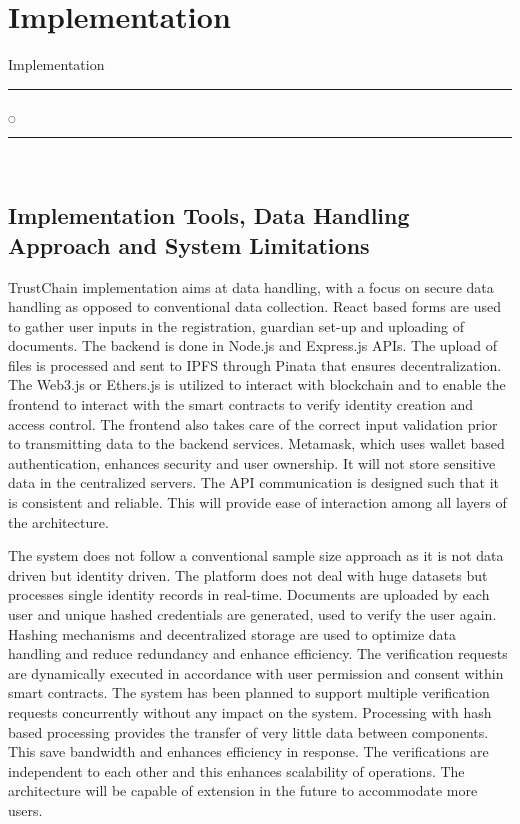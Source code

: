 
\chapter[Implementation]{Implementation}{Implementation}\label{im}

\noindent
\rule{0.49\textwidth}{0.75pt} $_{\bigcirc}$ \rule{0.49\textwidth}{0.75pt}\\


\section{Implementation Tools, Data Handling Approach and System Limitations}
TrustChain implementation aims at data handling, with a focus on secure data handling as opposed to conventional data collection. React based forms are used to gather user inputs in the registration, guardian set-up and uploading of documents. The backend is done in Node.js and Express.js APIs. The upload of files is processed and sent to IPFS through Pinata that ensures decentralization. The Web3.js or Ethers.js is utilized to interact with blockchain and to enable the frontend to interact with the smart contracts to verify identity creation and access control. The frontend also takes care of the correct input validation prior to transmitting data to the backend services. Metamask, which uses wallet based authentication, enhances security and user ownership. It will not store sensitive data in the centralized servers. The API communication is designed such that it is consistent and reliable. This will provide ease of interaction among all layers of the architecture.

The system does not follow a conventional sample size approach as it is not data driven but identity driven. The platform does not deal with huge datasets but processes single identity records in real-time. Documents are uploaded by each user and unique hashed credentials are generated, used to verify the user again. Hashing mechanisms and decentralized storage are used to optimize data handling and reduce redundancy and enhance efficiency. The verification requests are dynamically executed in accordance with user permission and consent within smart contracts. The system has been planned to support multiple verification requests concurrently without any impact on the system. Processing with hash based processing provides the transfer of very little data between components. This save bandwidth and enhances efficiency in response. The verifications are independent to each other and this enhances scalability of operations. The architecture will be capable of extension in the future to accommodate more users.

